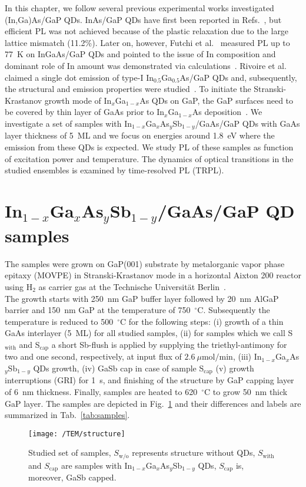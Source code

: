 In this chapter, we follow several previous experimental works investigated {(In,Ga)As}/{GaP} QDs. InAs/GaP QDs have first been reported in Refs.~\citep{Leon_apl1998, guo_solidi2009}, but efficient PL was not achieved because of the plastic relaxation due to the large lattice mismatch (11.2\%). Later on, however, Futchi et al.~\citep{Fuchi_physicaE2004} measured PL up to 77~K on InGaAs/GaP QDs and pointed to the issue of In composition and dominant role of In amount was demonstrated via calculations~\citep{Fukami_solodi2011}. Rivoire et al.~\citep{Rivoire_prb2012} claimed a single dot emission of type-I In$_{0.5}$Ga$_{0.5}$As/GaP QDs and, subsequently, the structural and emission properties were studied~\cite{Stracke_apl2014, Sala_apl2016}. To initiate the Stranski-Krastanov growth mode of In$_x$Ga$_{1-x}$As QDs on GaP, the GaP surfaces need to be covered by thin layer of GaAs prior to In$_x$Ga$_{1-x}$As deposition~\citep{stracke_apl2012_qdflash_GaP}.
%
%
%
%
We investigate a set of samples with In$_{1-x}$Ga$_{x}$As$_y$Sb$_{1-y}$/GaAs/GaP QDs with GaAs layer thickness of 5~ML and we focus on energies around 1.8~eV where the emission from these QDs is expected. We study PL of these samples as function of excitation power and temperature. The dynamics of optical transitions in the studied ensembles is examined by time-resolved PL (TRPL).


\section{In$_{1-x}$Ga$_{x}$As$_y$Sb$_{1-y}$/GaAs/GaP QD samples}
The samples were grown on GaP(001) substrate by metalorganic vapor phase epitaxy (MOVPE) in Stranski-Krastanov mode in a horizontal Aixton 200 reactor using H$_2$ as carrier gas at the Technische Universität Berlin~\citep{Sala_apl2016}. \\
%
\indent The growth starts with 250~nm GaP buffer layer followed by 20~nm AlGaP barrier and 150~nm GaP at the temperature of 750~$^\circ$C. Subsequently the temperature is reduced to 500~$^\circ$C for the following steps: (i) growth of a thin GaAs interlayer (5~ML) for all studied samples, (ii) for samples which we call S$_\mathrm{with}$ and S$_\mathrm{cap}$ a short Sb-flush is applied by supplying the triethyl-antimony for two and one second, respectively, at input flux of $2.6~\mu\mathrm{mol/min}$, (iii) In$_{1-x}$Ga$_{x}$As$_y$Sb$_{1-y}$ QDs growth, (iv) GaSb cap in case of sample S$_\mathrm{cap}$ (v) growth interruptions (GRI) for 1~s, and finishing of the structure by GaP capping layer of 6~nm thickness. Finally, samples are heated to 620~$^\circ$C to grow 50~nm thick GaP layer. The samples are depicted in Fig.~\ref{fig:TUstructure} and their differences and labels are summarized in Tab.~\ref{tab:samples}.
\begin{figure}
	\centering
	\texttt{[image: /TEM/structure]}
	\caption{Studied set of samples, $S_\mathrm{w/o}$ represents structure without QDs, $S_\mathrm{with}$ and $S_\mathrm{cap}$ are samples with In$_{1-x}$Ga$_{x}$As$_y$Sb$_{1-y}$ QDs, $S_\mathrm{cap}$ is, moreover, GaSb capped. }
	\label{fig:TUstructure}
\end{figure}


